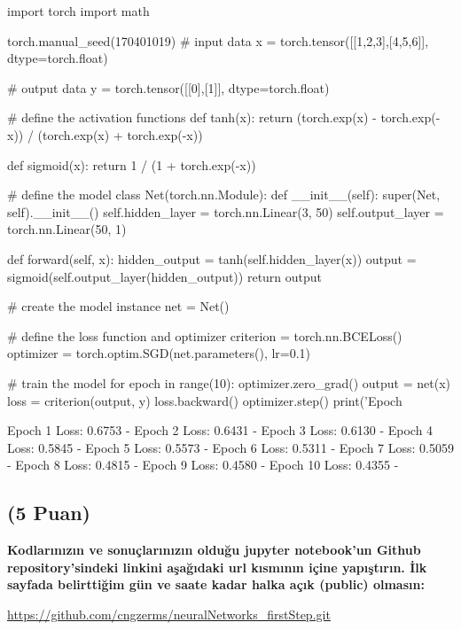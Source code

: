 \documentclass[11pt]{article}
\begin{document}
\begin{python}
import torch
import math

torch.manual_seed(170401019)
# input data
x = torch.tensor([[1,2,3],[4,5,6]], dtype=torch.float)

# output data
y = torch.tensor([[0],[1]], dtype=torch.float)

# define the activation functions
def tanh(x):
    return (torch.exp(x) - torch.exp(-x)) / (torch.exp(x) + torch.exp(-x))

def sigmoid(x):
    return 1 / (1 + torch.exp(-x))

# define the model
class Net(torch.nn.Module):
    def __init__(self):
        super(Net, self).__init__()
        self.hidden_layer = torch.nn.Linear(3, 50)
        self.output_layer = torch.nn.Linear(50, 1)
        
    def forward(self, x):
        hidden_output = tanh(self.hidden_layer(x))
        output = sigmoid(self.output_layer(hidden_output))
        return output

# create the model instance
net = Net()

# define the loss function and optimizer
criterion = torch.nn.BCELoss()
optimizer = torch.optim.SGD(net.parameters(), lr=0.1)

# train the model
for epoch in range(10):
    optimizer.zero_grad()
    output = net(x)
    loss = criterion(output, y)
    loss.backward()
    optimizer.step()
    print('Epoch %
\end{python}

Epoch 1 Loss: 0.6753 -
Epoch 2 Loss: 0.6431 -
Epoch 3 Loss: 0.6130 -
Epoch 4 Loss: 0.5845 -
Epoch 5 Loss: 0.5573 -
Epoch 6 Loss: 0.5311 -
Epoch 7 Loss: 0.5059 -
Epoch 8 Loss: 0.4815 -
Epoch 9 Loss: 0.4580 -
Epoch 10 Loss: 0.4355 -

\subsection{(5 Puan)} \textbf{Kodlarınızın ve sonuçlarınızın olduğu jupyter notebook'un Github repository'sindeki linkini aşağıdaki url kısmının içine yapıştırın. İlk sayfada belirttiğim gün ve saate kadar halka açık (public) olmasın:}

\url{https://github.com/cngzerms/neuralNetworks_firstStep.git}
\end{document}
